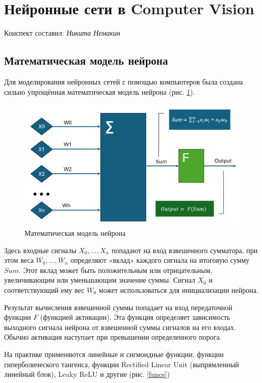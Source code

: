 \section{Нейронные сети в Computer Vision}
\begin{center}
    Конспект составил: \textit{Никита Немакин}
\end{center}

\subsection{Математическая модель нейрона}

Для моделирования нейронных сетей с помощью компьютеров была создана сильно упрощённая математическая модель нейрона (рис. \ref{neuron}).

\begin{figure}[H]
    \centering
    \includegraphics[width = 12cm]{neuron.jpg}
    \caption{Математическая модель нейрона}
    \label{neuron}
\end{figure}

Здесь входные сигналы $X_0,…,X_n$ попадают на вход взвешенного сумматора, при этом веса $W_0,…,W_n$ определяют «вклад» каждого сигнала на итоговую сумму $Sum$. Этот вклад может быть положительным или отрицательным, увеличивающим или уменьшающим значение суммы. Сигнал $X_0$ и соответствующий ему вес $W_0$ может использоваться для инициализации нейрона.

Результат вычисления взвешенной суммы попадает на вход передаточной функции $F$ (функцией активации). Эта функция определяет зависимость выходного сигнала нейрона от взвешенной суммы сигналов на его входах. Обычно активация наступает при превышении определенного порога.

На практике применяются линейные и сигмоидные функции, функции гиперболического тангенса, функции Rectified Linear Unit (выпрямленный линейный блок), Leaky ReLU и другие (рис. \ref{funcs})

